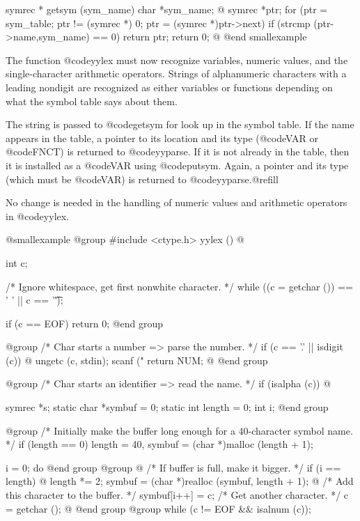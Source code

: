 {{{{{{{{{{{{{{symrec *
getsym (sym_name)
     char *sym_name;
@{
  symrec *ptr;
  for (ptr = sym_table; ptr != (symrec *) 0;
       ptr = (symrec *)ptr->next)
    if (strcmp (ptr->name,sym_name) == 0)
      return ptr;
  return 0;
@}
@end smallexample

The function @code{yylex} must now recognize variables, numeric values, and
the single-character arithmetic operators.  Strings of alphanumeric
characters with a leading nondigit are recognized as either variables or
functions depending on what the symbol table says about them.

The string is passed to @code{getsym} for look up in the symbol table.  If
the name appears in the table, a pointer to its location and its type
(@code{VAR} or @code{FNCT}) is returned to @code{yyparse}.  If it is not
already in the table, then it is installed as a @code{VAR} using
@code{putsym}.  Again, a pointer and its type (which must be @code{VAR}) is
returned to @code{yyparse}.@refill

No change is needed in the handling of numeric values and arithmetic
operators in @code{yylex}.

@smallexample
@group
#include <ctype.h>
yylex ()
@{
  int c;

  /* Ignore whitespace, get first nonwhite character.  */
  while ((c = getchar ()) == ' ' || c == '\t');

  if (c == EOF)
    return 0;
@end group

@group
  /* Char starts a number => parse the number.         */
  if (c == '.' || isdigit (c))
    @{
      ungetc (c, stdin);
      scanf ("%
      return NUM;
    @}
@end group

@group
  /* Char starts an identifier => read the name.       */
  if (isalpha (c))
    @{
      symrec *s;
      static char *symbuf = 0;
      static int length = 0;
      int i;
@end group

@group
      /* Initially make the buffer long enough
         for a 40-character symbol name.  */
      if (length == 0)
        length = 40, symbuf = (char *)malloc (length + 1);

      i = 0;
      do
@end group
@group
        @{
          /* If buffer is full, make it bigger.        */
          if (i == length)
            @{
              length *= 2;
              symbuf = (char *)realloc (symbuf, length + 1);
            @}
          /* Add this character to the buffer.         */
          symbuf[i++] = c;
          /* Get another character.                    */
          c = getchar ();
        @}
@end group
@group
      while (c != EOF && isalnum (c));

}}}}}}}}}}}}}}}}
